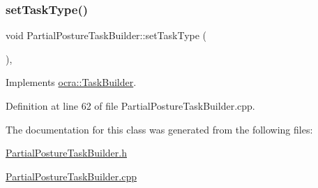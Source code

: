 \subsubsection{\texorpdfstring{set\+Task\+Type()}{setTaskType()}}
{\footnotesize\ttfamily void Partial\+Posture\+Task\+Builder\+::set\+Task\+Type (\begin{DoxyParamCaption}{ }\end{DoxyParamCaption})\hspace{0.3cm}{\ttfamily [protected]}, {\ttfamily [virtual]}}



Implements \hyperlink{classocra_1_1TaskBuilder_a1a979fc495be6dc30483aa8fd0ff2650}{ocra\+::\+Task\+Builder}.



Definition at line 62 of file Partial\+Posture\+Task\+Builder.\+cpp.



The documentation for this class was generated from the following files\+:\begin{DoxyCompactItemize}
\item 
\hyperlink{PartialPostureTaskBuilder_8h}{Partial\+Posture\+Task\+Builder.\+h}\item 
\hyperlink{PartialPostureTaskBuilder_8cpp}{Partial\+Posture\+Task\+Builder.\+cpp}\end{DoxyCompactItemize}
